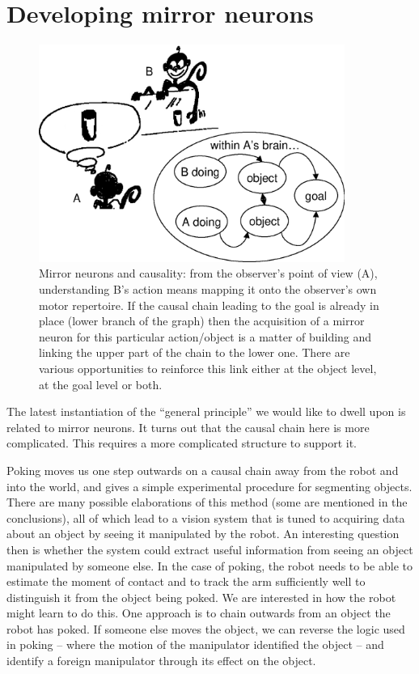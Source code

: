 
\section{Developing mirror neurons}

\begin{figure}[tb]
\begin{center}
\includegraphics[width=10cm]{mirror-monkey.eps}
\caption{ 
\label{fig:mirror-monkey}
%
Mirror neurons and causality: from the observer's point
of view (A), understanding B's action means mapping it onto the
observer's own
motor repertoire. If the causal chain leading to the goal is already
in place (lower branch of the graph) then the acquisition of a
mirror neuron for this particular action/object is a matter of
building and linking the upper part of the chain to the lower one.
There are various opportunities to reinforce this link either at the object
level, at the goal level or both. 
%
}
\end{center}
\end{figure}

\ifverbose
The latest instantiation of the ``general principle'' we would like to
dwell upon is related to mirror neurons. It turns out that the causal
chain here is more complicated. This requires a more complicated
structure to support it.
\fi

Poking moves us one step outwards on a causal chain away from the
robot and into the world, and gives a simple experimental procedure
for segmenting objects.  There are many possible elaborations of this
method (some are mentioned in the conclusions), all of which lead to a
vision system that is tuned to acquiring data about an object by
seeing it manipulated by the robot.  An interesting question then is
whether the system could extract useful information from seeing an
object manipulated by someone else.  In the case of poking, the robot
needs to be able to estimate the moment of contact and to track the arm
sufficiently well to distinguish it from the object being poked.  We
are interested in how the robot might learn to do this.  One approach
is to chain outwards from an object the robot has poked.  If someone
else moves the object, we can reverse the logic used in poking --
where the motion of the manipulator identified the object -- and
identify a foreign manipulator through its effect on the object.


